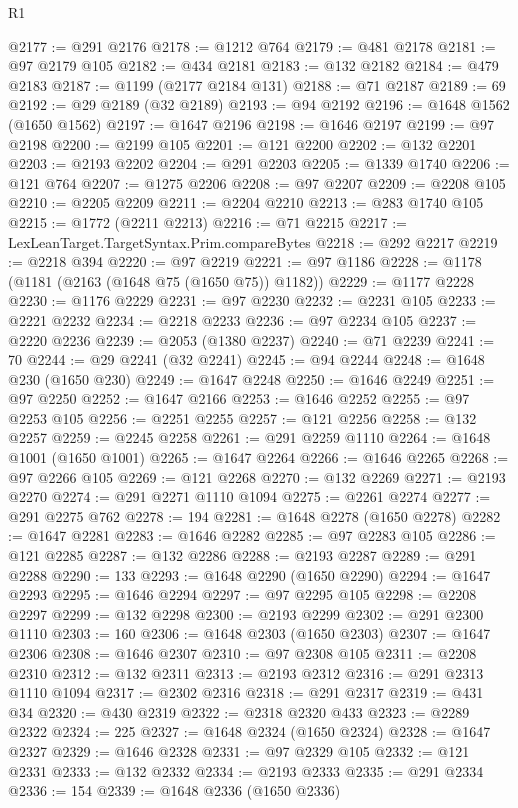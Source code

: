 \begin{lexlean}{R1}
\begin{coremodule}
{{{{{{{{{{{{{{{{{{{{{{{{{{{{{{{{{{{{{{{{{{{{{{{{{{{{{{{{{{{{{{{{{{{{{{{{{{{{{{{{{{{{{{{{{{{{{{{{{{{{{{{{{{{{{{{{{{{{{{{{{{{{{{{{{{{{{{{{{{{{{{{{{{{{{{{{{{{{{{{{{{{{{{{{{{{{{{{{{{{{{{{{{{@2177 := @291 @2176
@2178 := @1212 @764
@2179 := @481 @2178
@2181 := @97 @2179 @105
@2182 := @434 @2181
@2183 := @132 @2182
@2184 := @479 @2183
@2187 := @1199 (@2177 @2184 @131)
@2188 := @71 @2187
@2189 := 69
@2192 := @29 @2189 (@32 @2189)
@2193 := @94 @2192
@2196 := @1648 @1562 (@1650 @1562)
@2197 := @1647 @2196
@2198 := @1646 @2197
@2199 := @97 @2198
@2200 := @2199 @105
@2201 := @121 @2200
@2202 := @132 @2201
@2203 := @2193 @2202
@2204 := @291 @2203
@2205 := @1339 @1740
@2206 := @121 @764
@2207 := @1275 @2206
@2208 := @97 @2207
@2209 := @2208 @105
@2210 := @2205 @2209
@2211 := @2204 @2210
@2213 := @283 @1740 @105
@2215 := @1772 (@2211 @2213)
@2216 := @71 @2215
@2217 := LexLeanTarget.TargetSyntax.Prim.compareBytes
@2218 := @292 @2217
@2219 := @2218 @394
@2220 := @97 @2219
@2221 := @97 @1186
@2228 := @1178 (@1181 (@2163 (@1648 @75 (@1650 @75)) @1182))
@2229 := @1177 @2228
@2230 := @1176 @2229
@2231 := @97 @2230
@2232 := @2231 @105
@2233 := @2221 @2232
@2234 := @2218 @2233
@2236 := @97 @2234 @105
@2237 := @2220 @2236
@2239 := @2053 (@1380 @2237)
@2240 := @71 @2239
@2241 := 70
@2244 := @29 @2241 (@32 @2241)
@2245 := @94 @2244
@2248 := @1648 @230 (@1650 @230)
@2249 := @1647 @2248
@2250 := @1646 @2249
@2251 := @97 @2250
@2252 := @1647 @2166
@2253 := @1646 @2252
@2255 := @97 @2253 @105
@2256 := @2251 @2255
@2257 := @121 @2256
@2258 := @132 @2257
@2259 := @2245 @2258
@2261 := @291 @2259 @1110
@2264 := @1648 @1001 (@1650 @1001)
@2265 := @1647 @2264
@2266 := @1646 @2265
@2268 := @97 @2266 @105
@2269 := @121 @2268
@2270 := @132 @2269
@2271 := @2193 @2270
@2274 := @291 @2271 @1110 @1094
@2275 := @2261 @2274
@2277 := @291 @2275 @762
@2278 := 194
@2281 := @1648 @2278 (@1650 @2278)
@2282 := @1647 @2281
@2283 := @1646 @2282
@2285 := @97 @2283 @105
@2286 := @121 @2285
@2287 := @132 @2286
@2288 := @2193 @2287
@2289 := @291 @2288
@2290 := 133
@2293 := @1648 @2290 (@1650 @2290)
@2294 := @1647 @2293
@2295 := @1646 @2294
@2297 := @97 @2295 @105
@2298 := @2208 @2297
@2299 := @132 @2298
@2300 := @2193 @2299
@2302 := @291 @2300 @1110
@2303 := 160
@2306 := @1648 @2303 (@1650 @2303)
@2307 := @1647 @2306
@2308 := @1646 @2307
@2310 := @97 @2308 @105
@2311 := @2208 @2310
@2312 := @132 @2311
@2313 := @2193 @2312
@2316 := @291 @2313 @1110 @1094
@2317 := @2302 @2316
@2318 := @291 @2317
@2319 := @431 @34
@2320 := @430 @2319
@2322 := @2318 @2320 @433
@2323 := @2289 @2322
@2324 := 225
@2327 := @1648 @2324 (@1650 @2324)
@2328 := @1647 @2327
@2329 := @1646 @2328
@2331 := @97 @2329 @105
@2332 := @121 @2331
@2333 := @132 @2332
@2334 := @2193 @2333
@2335 := @291 @2334
@2336 := 154
@2339 := @1648 @2336 (@1650 @2336)
}}}}}}}}}}}}}}}}}}}}}}}}}}}}}}}}}}}}}}}}}}}}}}}}}}}}}}}}}}}}}}}}}}}}}}}}}}}}}}}}}}}}}}}}}}}}}}}}}}}}}}}}}}}}}}}}}}}}}}}}}}}}}}}}}}}}}}}}}}}}}}}}}}}}}}}}}}}}}}}}}}}}}}}}}}}}}}}}}}}}}}}}}}
\end{coremodule}
\end{lexlean}
